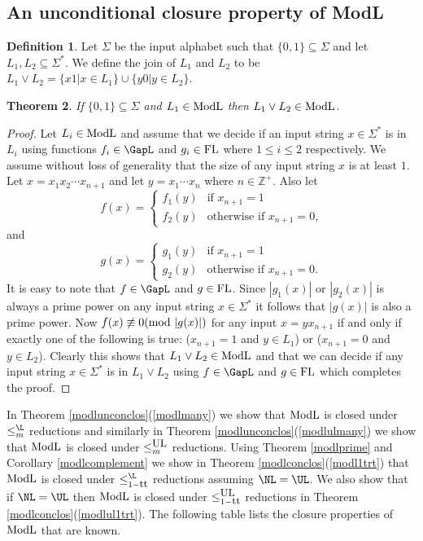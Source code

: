 \documentclass{amsbook}
\newtheorem{theorem}{Theorem}[chapter]
\theoremstyle{definition}
\newtheorem{definition}[theorem]{Definition}
\theoremstyle{remark}
\numberwithin{section}{chapter}
\numberwithin{equation}{chapter}
\newcommand{\ULredn}{\mbox{\small{\rm UL}}}
\newcommand{\ModL}{\mbox{\rm ModL}}
\newcommand{\FL}{\mbox{\rm FL}}
\renewcommand{\mod}{\mbox{\textrm mod~}}
\newcommand{\Z}{\mathbb{Z}}
\newcommand{\trt}{\mbox{\small{\rm tt}}}
\begin{document}
\subsection{An unconditional closure property of \textrm{ModL}}
\begin{definition}
Let $\Sigma$ be the input alphabet such that $\{ 0,1\}\subseteq\Sigma$ and let $L_1,L_2\subseteq\Sigma ^{*}$. We define the join of $L_1$ and $L_2$ to be $L_1\vee L_2=\{ x1|x\in L_1\}\cup \{ y0|y\in L_2\}$.
\end{definition}
\begin{theorem}\label{modljoin}
If $\{ 0,1\}\subseteq\Sigma$ and $L_1\in\ModL$ then $L_1\vee L_2\in\ModL$.
\end{theorem}
\begin{proof}
Let $L_i\in \ModL$ and assume that we decide if an input string $x\in\Sigma^{*}$ is in $L_i$ using functions  $f_i\in\GapL$ and $g_i\in \FL$ where $1\leq i\leq 2$ respectively. We assume without loss of generality that the size of any  input string $x$ is at least $1$. Let $x=x_1x_2\cdots x_{n+1}$ and let $y=x_1\cdots x_n$ where $n\in\Z^{+}$. Also let 
\[ f(x)=\left \{ \begin{array}{ll}
	f_1(y) & \mbox{if $x_{n+1}=1$}\\
	f_2(y) & \mbox{otherwise if $x_{n+1}=0$,}
\end{array}
\right. \]
and
\[ g(x)=\left \{ \begin{array}{ll}
	g_1(y) & \mbox{if $x_{n+1}=1$}\\
	g_2(y) & \mbox{otherwise if $x_{n+1}=0$.}
\end{array}
\right. \]
It is easy to note that $f\in\GapL$ and $g\in\FL$. Since $|g_1(x)|$ or $|g_2(x)|$ is always a prime power on any input string $x\in\Sigma ^{*}$ it follows that $|g(x)|$ is also a prime power. Now $f(x)\not\equiv 0(\mod |g(x)|)$ for any input $x=yx_{n+1}$ if and only if exactly one of the following is true:
($x_{n+1}=1$ and $y\in L_1$) or ($x_{n+1}=0$ and $y\in L_2$). Clearly this shows that $L_1\vee L_2\in\ModL$ and that we can decide if any input string $x\in\Sigma ^{*}$ is in $L_1\vee L_2$ using $f\in\GapL$ and $g\in\FL$ which completes the proof.
\end{proof}
In Theorem \ref{modlunconclos}(\ref{modlmany}) we show that $\ModL$ is closed under $\leq ^{\L}_m$ reductions and similarly in Theorem \ref{modlunconclos}(\ref{modlulmany}) we show that $\ModL$ is closed under $\leq ^{\ULredn}_m$ reductions. Using Theorem \ref{modlprime} and Corollary \ref{modlcomplement} we show in Theorem \ref{modlconclos}(\ref{modl1trt}) that $\ModL$ is closed under $\leq ^{\L}_{1-\trt}$ reductions assuming $\NL =\UL$.  We also show that if $\NL =\UL$ then $\ModL$ is closed under $\leq ^{\ULredn}_{1-\trt}$ reductions in Theorem \ref{modlconclos}(\ref{modlul1trt}). The following table lists the closure properties of $\ModL$ that are known.
\end{document}
